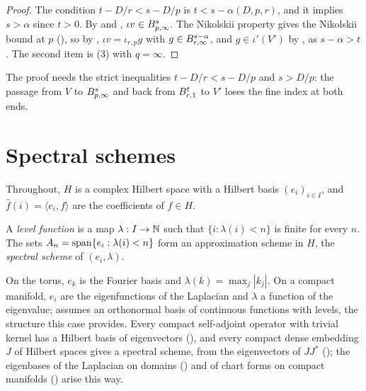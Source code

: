\begin{proof}
\leanok
{}
The condition $t - D/r < s - D/p$ is $t < s - \alpha(D, p, r)$, and it implies $s > \alpha$
since $t > 0$. By  and ,
$\iota v \in B^{s}_{p,\infty}$. The Nikolskii property gives the Nikolskii bound at $p$
(), so by , $\iota v = \iota_{r,p} g$ with
$g \in B^{s-\alpha}_{r,\infty}$, and $g \in \iota'(V')$ by , as
$s - \alpha > t$. The second item is (3) with $q = \infty$.
\end{proof}

The proof needs the strict inequalities $t - D/r < s - D/p$ and $s > D/p$: the passage from
$V$ to $B^{s}_{p,\infty}$ and back from $B^{t}_{r,1}$ to $V'$ loses the fine index at
both ends.

\chapter{Spectral schemes}
\label{ch:spectral}

Throughout, $H$ is a complex Hilbert space with a Hilbert basis $(e_i)_{i \in I}$, and
$\hat f(i) = \langle e_i, f \rangle$ are the coefficients of $f \in H$.

\begin{definition}
\label{def:spectral}
\leanok
{}
A \emph{level function} is a map $\lambda : I \to \mathbb{N}$ such that $\{i : \lambda(i) < n\}$ is
finite for every $n$. The sets $A_n = \operatorname{span}\{e_i : \lambda(i) < n\}$ form an approximation
scheme in $H$, the \emph{spectral scheme} of $(e_i, \lambda)$.
\end{definition}

On the torus, $e_k$ is the Fourier basis and $\lambda(k) = \max_j |k_j|$. On a compact
manifold, $e_i$ are the eigenfunctions of the Laplacian and $\lambda$ a function of the
eigenvalue;  assumes an orthonormal basis of continuous
functions with levels, the structure this case provides. Every compact self-adjoint operator
with trivial kernel has a Hilbert basis of eigenvectors (), and
every compact dense embedding $J$ of Hilbert spaces gives a spectral scheme, from the
eigenvectors of $J J^*$ (); the eigenbases of the Laplacian
on domains () and of chart forms on compact manifolds
() arise this way.

